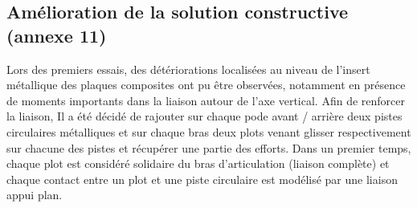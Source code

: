 \ifprof
\begin{corrige}
\end{corrige}
\else
\fi



\subsection{Amélioration de la solution constructive (annexe 11)}

Lors des premiers essais, des détériorations localisées au niveau de l’insert métallique des plaques composites ont pu être observées, notamment en présence de moments importants dans la liaison autour de l’axe vertical. Afin de
renforcer la liaison, Il a été décidé de rajouter sur chaque pode avant / arrière deux pistes circulaires métalliques et sur chaque bras deux plots venant glisser respectivement sur chacune des pistes et récupérer une partie des efforts.
Dans un premier temps, chaque plot est considéré solidaire du bras d’articulation (liaison complète) et chaque contact entre un plot et une piste circulaire est modélisé par une liaison appui plan.

\ifprof
\begin{corrige}
\end{corrige}
\else
\fi

